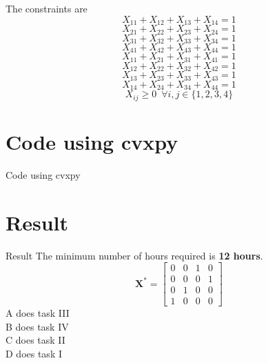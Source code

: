 \documentclass{beamer}
\begin{document}
\begin{frame}
 The constraints are
\begin{equation*}
    X_{11} + X_{12} + X_{13} + X_{14} = 1
\end{equation*}
\begin{equation*}
    X_{21} + X_{22} + X_{23} + X_{24} = 1
\end{equation*}
\begin{equation*}
    X_{31} + X_{32} + X_{33} + X_{34} = 1
\end{equation*}
\begin{equation*}
    X_{41} + X_{42} + X_{43} + X_{44} = 1
\end{equation*}
\begin{equation*}
    X_{11} + X_{21} + X_{31} + X_{41} = 1
\end{equation*}
\begin{equation*}
    X_{12} + X_{22} + X_{32} + X_{42} = 1
\end{equation*}
\begin{equation*}
    X_{13} + X_{23} + X_{33} + X_{43} = 1
\end{equation*}
\begin{equation*}
    X_{14} + X_{24} + X_{34} + X_{44} = 1
\end{equation*}
\begin{equation*}
    X_{ij} \geq 0 \enspace \forall i,j \in \{1,2,3,4\}
\end{equation*}
\end{frame}

\section{Code using cvxpy}
\begin{frame}{Code using cvxpy}

\end{frame}

\begin{frame}

\end{frame}

\section{Result}
\begin{frame}{Result}
The minimum number of hours required is \textbf{12 hours}.\\
\begin{equation*}
    \textbf{X}^{*}=
    \begin{bmatrix}
    0 & 0 & 1 & 0 \\
    0 & 0 & 0 & 1\\
    0 & 1 & 0 & 0\\
    1 & 0 & 0 & 0
\end{bmatrix}
\end{equation*}
A does task III\\
B does task IV\\
C does task II\\
D does task I\\
\end{frame}
\end{document}
